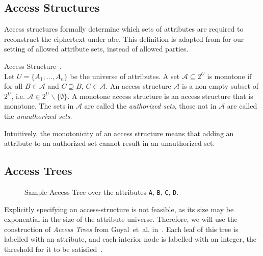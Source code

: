 \subsection{Access Structures}\label{sec:access-structures}
Access structures formally determine which sets of attributes are required to reconstruct the ciphertext under \acrshort{abe}.
This definition is adapted from \cite{beimel_secure_1996} for our setting of allowed attribute sets, instead of allowed parties.
\begin{definition}Access Structure~\cite{beimel_secure_1996}.\\
    Let $U = \{A_1, \dots, A_n\}$ be the universe of attributes.
    A set $\mathcal{A} \subseteq 2^{U}$ is monotone if for all $B \in \mathcal{A}$ and $C \supseteq B$,  $C \in \mathcal{A}$.
    An access structure $\mathcal{A}$ is a non-empty subset of $2^U$, i.e. $\mathcal{A} \in 2^U \backslash \{\emptyset\}$. A monotone access structure is an access structure that is monotone.
    The sets in $\mathcal{A}$ are called the \emph{authorized sets}, those not in $\mathcal{A}$ are called the \emph{unauthorized sets}.
\end{definition}

Intuitively, the monotonicity of an access structure means that adding an attribute to an authorized set cannot result in an unauthorized set. 

\subsection{Access Trees}\label{sec:access-trees}

\begin{figure}
    \centering
    \caption[Sample Access Tree]{
        Sample Access Tree over the attributes \texttt{A}, \texttt{B}, \texttt{C}, \texttt{D}.
    }
    \label{fig:sample-access-tree}
\end{figure}
Explicitly specifying an \gls{access-structure} is not feasible, as its size may be exponential in the size of the attribute universe.
Therefore, we will use the construction of \emph{Access Trees} from Goyal~et~al. in~\cite{goyal_attribute-based_2006}.
Each leaf of this tree is labelled with an attribute, and each interior node is labelled with an integer, the threshold for it to be satisfied~\cite{goyal_attribute-based_2006}.

